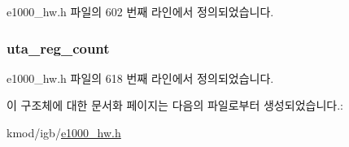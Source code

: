e1000\+\_\+hw.\+h 파일의 602 번째 라인에서 정의되었습니다.

\subsubsection[{\texorpdfstring{uta\+\_\+reg\+\_\+count}{uta_reg_count}}]{ uta\+\_\+reg\+\_\+count}\hypertarget{structe1000__mac__info_a2a29ddf2038d437071aabfc5411c2761}{}\label{structe1000__mac__info_a2a29ddf2038d437071aabfc5411c2761}


e1000\+\_\+hw.\+h 파일의 618 번째 라인에서 정의되었습니다.



이 구조체에 대한 문서화 페이지는 다음의 파일로부터 생성되었습니다.\+:\begin{DoxyCompactItemize}
\item 
kmod/igb/\hyperlink{kmod_2igb_2e1000__hw_8h}{e1000\+\_\+hw.\+h}\end{DoxyCompactItemize}
